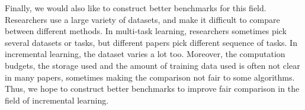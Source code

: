 Finally, we would also like to construct better benchmarks for this field. Researchers use a large variety of datasets, and make it difficult to compare between different methods. In multi-task learning, researchers sometimes pick several datasets or tasks, but different papers pick different sequence of tasks. In incremental learning, the dataset varies a lot too. Moreover, the computation budgets, the storage used and the amount of training data used is often not clear in many papers, sometimes making the comparison not fair to some algorithms. Thus, we hope to construct better benchmarks to improve fair comparison in the field of incremental learning.


